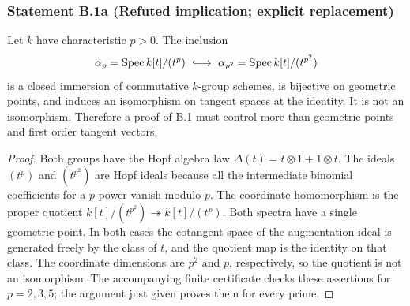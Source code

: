 \subsubsection*{Statement B.1a (Refuted implication; explicit replacement)}
Let $k$ have characteristic $p>0$.  The inclusion
\[
 \alpha_p=\operatorname{Spec}k[t]/(t^p)
 \ \longhookrightarrow\ 
 \alpha_{p^2}=\operatorname{Spec}k[t]/(t^{p^2})
\]
is a closed immersion of commutative $k$-group schemes, is bijective on
geometric points, and induces an isomorphism on tangent spaces at the
identity.  It is not an isomorphism.  Therefore a proof of B.1 must
control more than geometric points and first order tangent vectors.
\begin{proof}
Both groups have the Hopf algebra law $\Delta(t)=t\otimes1+1\otimes t$.
The ideals $(t^{p})$ and $(t^{p^2})$ are Hopf ideals because all the
intermediate binomial coefficients for a $p$-power vanish modulo $p$.
The coordinate homomorphism is the proper quotient
$k[t]/(t^{p^2})\twoheadrightarrow k[t]/(t^p)$.  Both spectra have a
single geometric point.  In both cases the cotangent space of the
augmentation ideal is generated freely by the class of $t$, and the
quotient map is the identity on that class.  The coordinate dimensions
are $p^2$ and $p$, respectively, so the quotient is not an isomorphism.
The accompanying finite certificate checks these assertions for
$p=2,3,5$; the argument just given proves them for every prime.
\end{proof}

